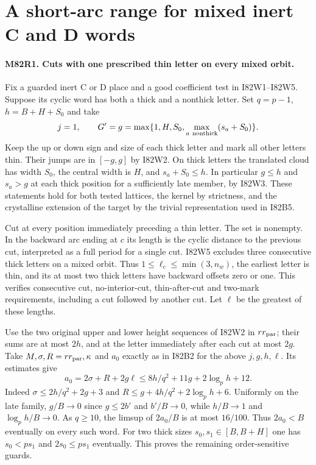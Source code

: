 \section{A short-arc range for mixed inert C and D words}

\paragraph{M82R1. Cuts with one prescribed thin letter on every mixed orbit.}
Fix a guarded inert C or D place and a good coefficient test in
I82W1--I82W5. Suppose its cyclic word has both a thick and a
nonthick letter. Set $q=p-1$, $h=B+H+S_0$ and take
\[
    j=1,\qquad G'=g=\max\{1,H,S_0,
                         \max_{a\ {\rm nonthick}}(s_a+S_0)\}.
\]
Keep the up or down sign and size of each thick letter and mark
all other letters thin. Their jumps are in $[-g,g]$ by I82W2.
On thick letters the translated cloud has width $S_0$, the
central width is $H$, and $s_a+S_0\le h$. In particular
$g\le h$ and $s_a>g$ at each thick position for a sufficiently
late member, by I82W3. These statements hold for both tested
lattices, the kernel by strictness, and the crystalline extension
of the target by the trivial representation used in I82B5.

Cut at every position immediately preceding a thin letter. The
set is nonempty. In the backward arc ending at $c$ its length
is the cyclic distance to the previous cut, interpreted as a full
period for a single cut. I82W5 excludes three consecutive thick
letters on a mixed orbit. Thus $1\le\ell_c\le\min(3,n_w)$,
the earliest letter is thin, and its at most two thick letters
have backward offsets zero or one. This verifies consecutive
cut, no-interior-cut, thin-after-cut and two-mark requirements,
including a cut followed by another cut. Let $\ell$ be the
greatest of these lengths.

Use the two original upper and lower height sequences of I82W2
in $rr_{\rm par}$; their sums are at most $2h$, and at the
letter immediately after each cut at most $2g$.
Take $M,\sigma,R=rr_{\rm par},\kappa$ and $a_0$ exactly as in
I82B2 for the above $j,g,h,\ell$. Its estimates give
\[
 a_0=2\sigma+R+2g\ell
     \le 8h/q^2+11g+2\log_p h+12 .
\]
Indeed $\sigma\le2h/q^2+2g+3$ and
$R\le g+4h/q^2+2\log_p h+6$. Uniformly on the late family,
$g/B\to0$ since $g\le2b'$ and $b'/B\to0$, while $h/B\to1$
and $\log_p h/B\to0$. As $q\ge10$, the limsup of $2a_0/B$
is at most $16/100$. Thus $2a_0<B$ eventually on every such
word. For two thick sizes $s_0,s_1\in[B,B+H]$ one has
$s_0<p s_1$ and $2s_0\le p s_1$ eventually. This proves
the remaining order-sensitive guards.

